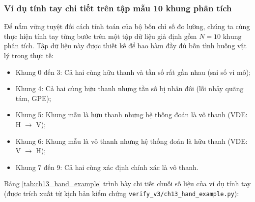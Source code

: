 \subsubsection*{Ví dụ tính tay chi tiết trên tập mẫu 10 khung phân tích}
Để nắm vững tuyệt đối cách tính toán của bộ bốn chỉ số đo lường, chúng ta cùng thực hiện tính tay từng bước trên một tập dữ liệu giả định gồm $N = 10\text{ khung}$ phân tích. Tập dữ liệu này được thiết kế để bao hàm đầy đủ bốn tình huống vật lý trong thực tế:
\begin{itemize}
    \item Khung 0 đến 3: Cả hai cùng hữu thanh và tần số rất gần nhau (sai số vi mô);
    \item Khung 4: Cả hai cùng hữu thanh nhưng tần số bị nhân đôi (lỗi nhảy quãng tám, GPE);
    \item Khung 5: Khung mẫu là hữu thanh nhưng hệ thống đoán là vô thanh (VDE: H $\to$ V);
    \item Khung 6: Khung mẫu là vô thanh nhưng hệ thống đoán là hữu thanh (VDE: V $\to$ H);
    \item Khung 7 đến 9: Cả hai cùng xác định chính xác là vô thanh.
\end{itemize}

Bảng \ref{tab:ch13_hand_example} trình bày chi tiết chuỗi số liệu của ví dụ tính tay (được trích xuất từ kịch bản kiểm chứng \texttt{verify\_v3/}\allowbreak\texttt{ch13\_hand\_}\allowbreak\texttt{example.py}):

